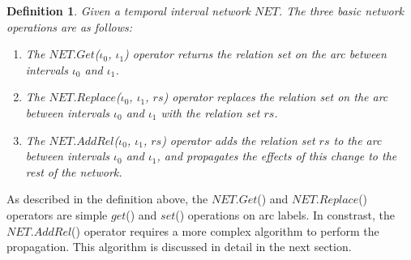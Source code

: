 \documentclass[11pt]{report}
\newtheorem{vdefinition}{Definition}[chapter]
\begin{document}
          \begin{vdefinition}
            \label{defn-tempo-oprtn}
            Given a temporal interval network $NET$. The three basic network
            operations are as follows:

            \begin{enumerate}
              \item
                The $NET.Get$($\iota_0$, $\iota_1$) operator returns the
                relation set on the arc between intervals $\iota_0$ and
                $\iota_1$.

              \item
                The $NET$.$Replace$($\iota_0$, $\iota_1$, $rs$) operator
                replaces the relation set on the arc between intervals
                $\iota_0$ and $\iota_1$ with the relation set $rs$.
              \item
                The $NET.AddRel$($\iota_0$, $\iota_1$, $rs$) operator adds the
                relation set $rs$ to the arc between intervals $\iota_0$ and
                $\iota_1$, and propagates the effects of this change to the
                rest of the network.
            \end{enumerate}
          \end{vdefinition}

          As described in the definition above, the $NET.Get$() and
          $NET.Replace$() operators are simple $get$() and $set$() operations
          on arc labels. In constrast, the $NET.AddRel$() operator requires a
          more complex algorithm to perform the propagation. This algorithm is
          discussed in detail in the next section.
\end{document}
